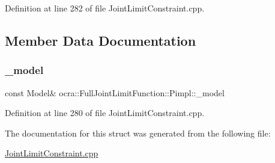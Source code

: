 Definition at line 282 of file Joint\+Limit\+Constraint.\+cpp.



\subsection{Member Data Documentation}
\hypertarget{structFullJointLimitFunction_1_1Pimpl_a1405a83bd59c5c592bec3e5ec1f394ca}{}\label{structFullJointLimitFunction_1_1Pimpl_a1405a83bd59c5c592bec3e5ec1f394ca} 
\subsubsection{\texorpdfstring{\+\_\+model}{\_model}}
{\footnotesize\ttfamily const Model\& ocra\+::\+Full\+Joint\+Limit\+Function\+::\+Pimpl\+::\+\_\+model}



Definition at line 280 of file Joint\+Limit\+Constraint.\+cpp.



The documentation for this struct was generated from the following file\+:\begin{DoxyCompactItemize}
\item 
\hyperlink{JointLimitConstraint_8cpp}{Joint\+Limit\+Constraint.\+cpp}\end{DoxyCompactItemize}
